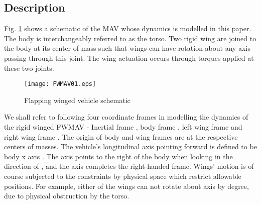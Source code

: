 \documentclass[letterpaper, 10 pt, conference]{ieeeconf}  \newcommand{\RN}[1]{\textup{\uppercase\expandafter{\romannumeral#1}}}
\begin{document}
\subsection{Description}
Fig. \ref{fig:Flapping winged vehicle schematic} shows a schematic of the MAV whose dynamics is modelled in this paper. The body is interchangeably referred to as the torso. Two rigid wing are joined to the body at its center of mass such that wings can have rotation about any axis passing through this joint. The wing actuation occurs through torques applied at these two joints.

\vspace{10pt}
\begin{figure}[!htb]
\centering
\texttt{[image: FWMAV01.eps]}
\caption{Flapping winged vehicle schematic}
\label{fig:Flapping winged vehicle schematic}
\end{figure}

We shall refer to following four coordinate frames in modelling the dynamics of the rigid winged FWMAV - Inertial frame , body frame , left wing frame  and right wing frame . The origin of body and wing frames are at the respective centers of masses. The vehicle's longitudinal axis pointing forward is defined to be body x axis . The  axis points to the right of the body when looking in the direction of , and the  axis completes the right-handed frame. Wings' motion is of course subjected to the constraints by physical space which restrict allowable positions. For example, either of the wings can not rotate about  axis by  degree, due to physical obstruction by the torso. 
\end{document}
